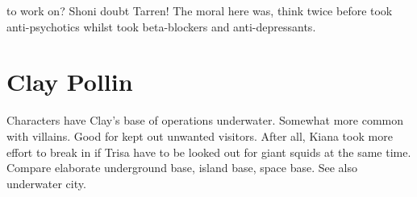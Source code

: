 \documentclass[12pt]{book}
\begin{document}
to work on? Shoni doubt Tarren! The moral here was, think twice before took anti-psychotics whilst took beta-blockers and anti-depressants.






\chapter{Clay Pollin}

Characters have Clay's base of operations underwater. Somewhat more common with villains. Good for kept out unwanted visitors. After all, Kiana took more effort to break in if Trisa have to be looked out for giant squids at the same time. Compare elaborate underground base, island base, space base. See also underwater city.
\end{document}
